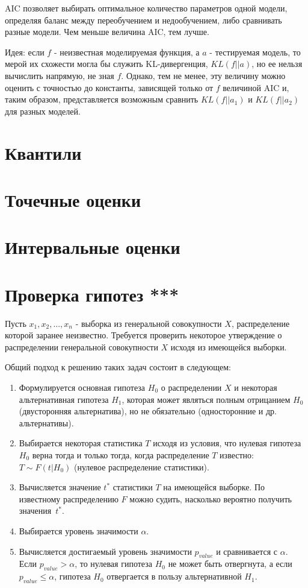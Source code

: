 AIC позволяет выбирать оптимальное количество параметров одной модели, определяя баланс между переобучением и недообучением, либо сравнивать разные модели. Чем меньше величина AIC, тем лучше.

Идея: если $f$ - неизвестная моделируемая функция, а $a$ - тестируемая модель, то мерой их схожести могла бы служить KL-дивергенция, $KL(f||a)$, но ее нельзя вычислить напрямую, не зная $f$. Однако, тем не менее, эту величину можно оценить с точностью до константы, зависящей только от $f$ величиной AIC и, таким образом, представляется возможным сравнить $KL(f||a_1)$ и $KL(f||a_2)$ для разных моделей.


\section{Квантили}


\section{Точечные оценки}


\section{Интервальные оценки}


\section{Проверка гипотез ***}

Пусть $x_1, x_2, ..., x_n$ - выборка из генеральной совокупности $X$, распределение которой заранее неизвестно.
Требуется проверить некоторое утверждение о распределении генеральной совокупности $X$ исходя из имеющейся выборки.

Общий подход к решению таких задач состоит в следующем:
\begin{enumerate}
    \item Формулируется основная гипотеза $H_0$ о распределении $X$ и некоторая альтернативная гипотеза $H_1$, которая может являться полным отрицанием $H_0$ (двусторонняя альтернатива), но не обязательно (односторонние и др. альтернативы).
    \item Выбирается некоторая статистика $T$ исходя из условия, что нулевая гипотеза $H_0$ верна тогда и только тогда, когда распределение $T$ известно: $T \sim F(t|H_0)$ (нулевое распределение статистики). 
    \item Вычисляется значение $t^*$ статистики $T$ на имеющейся выборке. По известному распределению $F$ можно судить, насколько вероятно получить значения~$t^*$.
    \item Выбирается уровень значимости $\alpha$.
    \item Вычисляется достигаемый уровень значимости $p_{value}$ и сравнивается с $\alpha$. Если $p_{value} > \alpha$, то нулевая гипотеза $H_0$ не может быть отвергнута, а если $p_{value} \leqslant \alpha$, гипотеза $H_0$ отвергается в пользу альтернативной $H_1$.
\end{enumerate}

